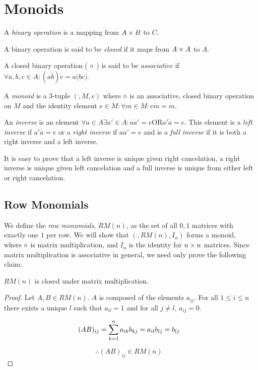 \chapter{Monoids}

A \emph{binary operation} is a mapping from $A \cross B$ to $ C $.

A binary operation is said to be \emph{closed} if it maps from $A
\cross A$ to $A$.

A closed binary operation ( $ \dot $ ) is said to be
\emph{associative} if $ \forall a,b,c \in A: ( a \dot b ) \dot c = a
\dot ( b \dot c )$.

A \emph{monoid} is a 3-tuple $(\dot, M, e)$ where $\dot$ is an
associative, closed binary operation on $M$ and the identity element $
e \in M: \forall m \in M: e \dot m = m $.

An \emph{inverse} is an element $\forall a \in A \exists a' \in A: a
\dot a' = e \text{OR} a' \dot a = e$.  This element is a \emph{left
  inverse} if $a' \dot a = e$ or a \emph{right inverse} if $a \dot a'
= e$ and is a \emph{full inverse} if it is both a right inverse and a
left inverse.

It is easy to prove that a left inverse is unique given right
cancelation, a right inverse is unique given left cancelation and a
full inverse is unique from either left or right cancelation.

\section{Row Monomials}

We define the \emph{row monomials}, $RM(n)$, as the set of all $0,1$
matrices with exactly one $1$ per row.  We will show that
$(\dot,RM(n),I_n)$ forms a monoid, where $\dot$ is matrix
multiplication, and $I_n$ is the identity for $n \cross n$ matrices.
Since matrix multiplication is associative in general, we need only
prove the following claim:

\begin{claim}

  $RM(n)$ is closed under matrix multiplication.

\end{claim}

\begin{proof}

  Let $A,B \in RM(n)$.  $A$ is composed of the elements $a_{ij}$.  For
  all $1 \leq i \leq n$ there exists a unique $l$ such that $a_{il} =
  1$ and for all $j \neq l$, $a_{ij} = 0$.

  \[
  (AB)_{ij} = \summ{k=1}{n} a_{ik}b_{kj} = a_{il}b_{lj} = b_{lj}
  \]

  \[
  \therefore (AB)_{ij} \in RM(n)
  \]
  
\end{proof}


